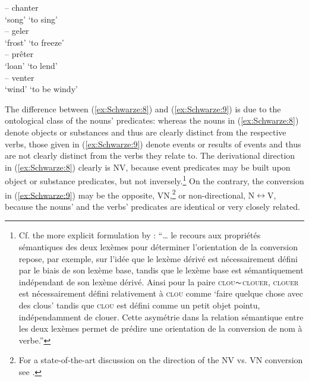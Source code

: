 \documentclass[output=paper]{langsci/langscibook}
\begin{document}
\ea\label{ex:Schwarze:9}
    \ea {} -- {chanter} \\
          `song' {} {`to sing'}\\

    \ex {} -- {geler} \\
          `frost' {} {`to freeze'}\\

    \ex {} -- {prêter} \\
          `loan' {} {`to lend'}\\

    \ex {} -- {venter} \\
          `wind' {} {`to be windy'}\\
\z\z

The difference between (\ref{ex:Schwarze:8}) and (\ref{ex:Schwarze:9}) is due to the ontological class of the nouns' predicates: whereas the nouns in (\ref{ex:Schwarze:8}) denote objects or substances and thus are clearly distinct from the respective verbs,
those given in (\ref{ex:Schwarze:9}) denote events or results of events and thus are not clearly distinct from the verbs they relate to. The derivational direction in (\ref{ex:Schwarze:8}) clearly is N\textrightarrow{}V, because event predicates may be built upon object or substance predicates, but not inversely.\footnote{Cf. the more explicit formulation by %
\citet[140]{Tribout2010a}%
%
: \enquote{\ldots{} le recours aux propriétés sémantiques des deux lexèmes pour déterminer l'orientation de la conversion repose, par exemple, sur l'idée que le lexème dérivé est nécessairement défini par le biais de son lexème base, tandis que le lexème base est sémantiquement indépendant de son lexème dérivé. Ainsi pour la paire \textsc{clou}$\thicksim$\textsc{clouer}, \textsc{clouer} est nécessairement défini relativement à \textsc{clou} comme \enquote{faire quelque chose avec des clous} tandis que \textsc{clou} est défini comme un petit objet pointu, indépendamment de clouer. Cette asymétrie dans la relation sémantique entre les deux lexèmes permet de prédire une orientation de la conversion de nom à verbe.}} On the contrary, the conversion in (\ref{ex:Schwarze:9}) may be the opposite, V\textrightarrow{}N,\footnote{For a state-of-the-art discussion on the direction of the  N\textrightarrow{}V vs. V\textrightarrow{}N conversion see %
\citet[348--356]{Tribout2010}.} or non-directional, N$\leftrightarrow$V, because the nouns' and the verbs' predicates are identical or very closely related.
\end{document}
